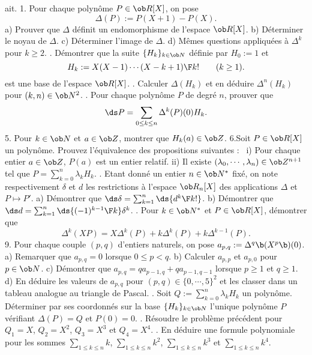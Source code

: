 \exo [Origin=,Level=1,Fight=3,Learn=4,Type=\Problèmes,Field=\EspacesVectoriels,Indication={1d) calculer l'image par $\Delta$ des espaces $\ob R_n[X]$.\medskip\noindent 5) Calculer $H_k(a)$ selon 3 cas.}] ait. 
1. Pour chaque polynôme $P\in\ob R[X]$, on pose 
$$
\Delta(P):=P(X+1)-P(X).
$$
a) Prouver que $\Delta$ définit un endomorphisme de l'espace $\ob R[X]$. 
\pn 
b) Déterminer le noyau de $\Delta$. 
\pn
c) Déterminer l'image de $\Delta$. 
\pn
d) Mêmes questions appliquées à $\Delta^k$ pour $k\ge2$. 
. Démontrer que la suite $\{H_k\}_{k\in\ob N}$ définie par $H_0:=1$ et 
$$
H_k:={X(X-1)\cdots(X-k+1)\F k!}\qquad(k\ge1).
$$ 
est une base de l'espace $\ob R[X]$.
\medskip
{}. Calculer $\Delta(H_k)$ et en déduire $\Delta^n(H_k)$ pour $(k,n)\in\ob N^2$. 
\medskip
{}. Pour chaque polynôme $P$ de degré $n$, prouver que 
$$
\ds P=\sum_{0\le k\le n}\Delta^k(P)(0)H_k.
$$
5. Pour $k\in\ob N$ et $a\in\ob Z$, montrer que $H_k(a)\in\ob Z$. 
\medskip
\noindent
6.Soit $P\in\ob R[X]$ un polynôme. Prouvez l'équivalence des propositions suivantes : 
\medskip
\noindent
\ i) Pour chaque entier $a\in\ob Z$, $P(a)$ est un entier relatif. 
\pn
ii) Il existe $(\lambda_0,\cdots,\lambda_n)\in\ob Z^{n+1}$ tel que $P=\sum_{k=0}^n\lambda_kH_k$. 
\medskip
{}. Etant donné un entier $n\in\ob N^*$ fixé, on note respectivement $\delta$ et $d$ les restrictions à l'espace $\ob R_n[X]$ des applications $\Delta$ et $P\mapsto P'$. 
\medskip
\noindent
a) Démontrer que $\ds\delta=\sum_{k=1}^n\ds{d^k\F k!}$. 
\smallskip
\noindent
b) Démontrer que $\ds d=\sum_{k=1}^n\ds{(-1)^{k-1}\F k}\delta^k$. 
\medskip
{}. Pour $k\in\ob N^*$ et $P\in\ob R[X]$, démontrer que 
$$
\Delta^k(XP)=X\Delta^k(P)+k\Delta^k(P)+k\Delta^{k-1}(P).
$$
9. Pour chaque couple $(p,q)$ d'entiers naturels, on pose $a_{p,q}:=\Delta^q\b(X^p\b)(0)$. 
\pn
a) Remarquer que $a_{p,q}=0$ lorsque $0\le p<q$. 
\pn
b) Calculer $a_{p,p}$ et $a_{p,0}$ pour $p\in\ob N$. 
\pn
c) Démontrer que $a_{p,q}=qa_{p-1,q}+qa_{p-1,q-1}$ lorsque $p\ge1$ et $q\ge1$. 
\pn
d) En déduire les valeurs de $a_{p,q}$ pour $(p,q)\in\{0,\cdots,5\}^2$ et les classer dans un tableau analogue au triangle de Pascal.  
\medskip
{}. Soit $Q:=\sum_{k=0}^n\lambda_kH_k$ un polynôme. Déterminer par ses coordonnés sur la base $\{H_k\}_{k\in\ob N}$ l'unique polynôme $P$ vérifiant $\Delta(P)=Q$ et $P(0)=0$. 
\medskip
{}. Résoudre le problème précédent pour $Q_1=X$, $Q_2=X^2$, $Q_3=X^3$ et $Q_4=X^4$. 
\medskip
{}. En déduire une formule polynomiale pour les sommes $\sum\limits_{1\le k\le n}k$, $\sum\limits_{1\le k\le n}k^2$, $\sum\limits_{1\le k\le n}k^3$ et $\sum\limits_{1\le k\le n}k^4$. 


